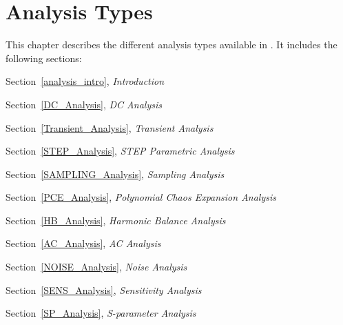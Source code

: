 


\chapter{Analysis Types}
\label{Analysis_Chap}

{
This chapter describes the different analysis types
available in \Xyce{}.  It includes the following sections:
\begin{XyceItemize}
\item Section~\ref{analysis_intro},     {\em Introduction}
\item Section~\ref{DC_Analysis},        {\em DC Analysis}
\item Section~\ref{Transient_Analysis}, {\em Transient Analysis}
\item Section~\ref{STEP_Analysis},      {\em STEP Parametric Analysis}
\item Section~\ref{SAMPLING_Analysis},  {\em Sampling Analysis}
\item Section~\ref{PCE_Analysis},      {\em Polynomial Chaos Expansion Analysis}
\item Section~\ref{HB_Analysis},        {\em Harmonic Balance Analysis}
\item Section~\ref{AC_Analysis},        {\em AC Analysis}
\item Section~\ref{NOISE_Analysis},     {\em Noise Analysis}
\item Section~\ref{SENS_Analysis},      {\em Sensitivity Analysis}
\item Section~\ref{SP_Analysis},        {\em S-parameter Analysis}
\end{XyceItemize}
}

